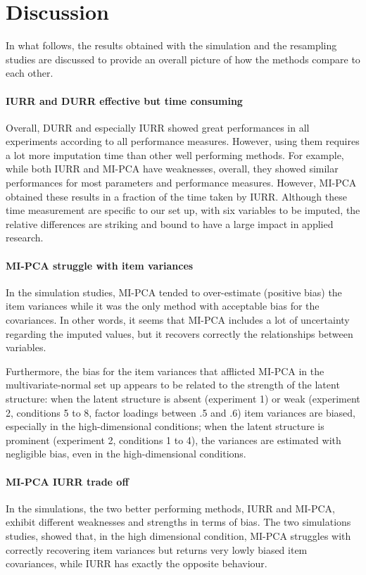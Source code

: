 \section{Discussion}

In what follows, the results obtained with the simulation and the resampling studies are discussed to provide
an overall picture of how the methods compare to each other.

\paragraph{IURR and DURR effective but time consuming}
	Overall, DURR and especially IURR showed great performances in all experiments according to all performance measures.
	However, using them requires a lot more imputation time than other well performing methods.
	For example, while both IURR and MI-PCA have weaknesses, overall, they showed similar performances for most parameters 
	and performance measures.
	However, MI-PCA obtained these results in a fraction of the time taken by IURR.
	Although these time measurement are specific to our set up, with six variables to be imputed, the
	relative differences are striking and bound to have a large impact in applied research.

\paragraph{MI-PCA struggle with item variances}
	In the simulation studies, MI-PCA tended to over-estimate (positive bias) the item variances while it was the only method
	with acceptable bias for the covariances.
	In other words, it seems that MI-PCA includes a lot of uncertainty regarding the imputed values, but it recovers 
	correctly the relationships between variables.

	Furthermore, the bias for the item variances that afflicted MI-PCA in the multivariate-normal set up appears to be 
	related to the strength of the latent structure: when the latent structure is absent (experiment 1) or weak (experiment 2, 
	conditions 5 to 8, factor loadings between .5 and .6) item variances are biased, especially in the high-dimensional
	conditions; 
	when the latent structure is prominent (experiment 2, conditions 1 to 4), the variances are estimated with 
	negligible bias, even in the high-dimensional conditions.


\paragraph{MI-PCA IURR trade off}
	In the simulations, the two better performing methods, IURR and MI-PCA, exhibit different weaknesses and strengths in 
	terms of bias.
	The two simulations studies, showed that, in the high dimensional condition, MI-PCA struggles with correctly 
	recovering item variances but returns very lowly biased item covariances, while IURR has exactly the opposite 
	behaviour.

